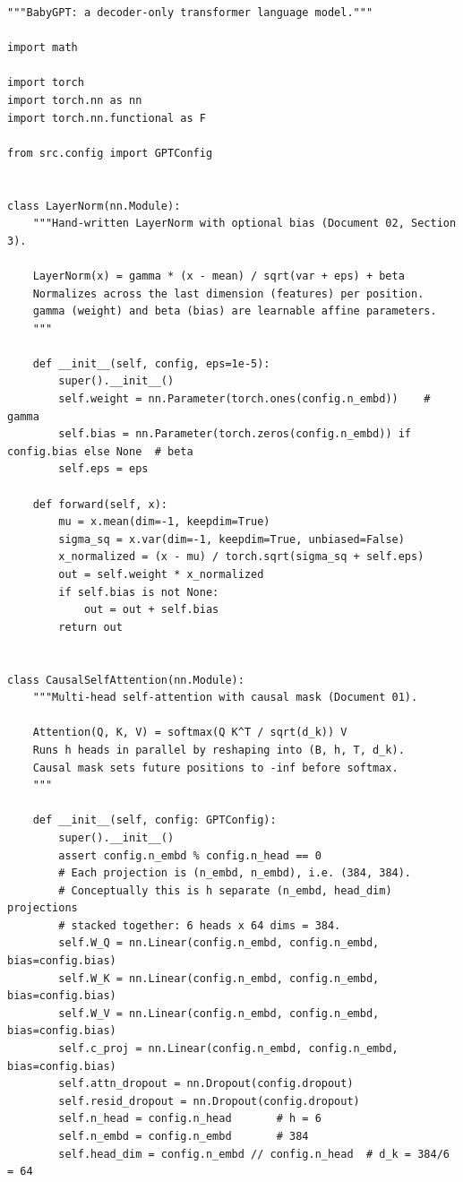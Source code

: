 \begin{lstlisting}
"""BabyGPT: a decoder-only transformer language model."""

import math

import torch
import torch.nn as nn
import torch.nn.functional as F

from src.config import GPTConfig


class LayerNorm(nn.Module):
    """Hand-written LayerNorm with optional bias (Document 02, Section 3).

    LayerNorm(x) = gamma * (x - mean) / sqrt(var + eps) + beta
    Normalizes across the last dimension (features) per position.
    gamma (weight) and beta (bias) are learnable affine parameters.
    """

    def __init__(self, config, eps=1e-5):
        super().__init__()
        self.weight = nn.Parameter(torch.ones(config.n_embd))    # gamma
        self.bias = nn.Parameter(torch.zeros(config.n_embd)) if config.bias else None  # beta
        self.eps = eps

    def forward(self, x):
        mu = x.mean(dim=-1, keepdim=True)
        sigma_sq = x.var(dim=-1, keepdim=True, unbiased=False)
        x_normalized = (x - mu) / torch.sqrt(sigma_sq + self.eps)
        out = self.weight * x_normalized
        if self.bias is not None:
            out = out + self.bias
        return out


class CausalSelfAttention(nn.Module):
    """Multi-head self-attention with causal mask (Document 01).

    Attention(Q, K, V) = softmax(Q K^T / sqrt(d_k)) V
    Runs h heads in parallel by reshaping into (B, h, T, d_k).
    Causal mask sets future positions to -inf before softmax.
    """

    def __init__(self, config: GPTConfig):
        super().__init__()
        assert config.n_embd % config.n_head == 0
        # Each projection is (n_embd, n_embd), i.e. (384, 384).
        # Conceptually this is h separate (n_embd, head_dim) projections
        # stacked together: 6 heads x 64 dims = 384.
        self.W_Q = nn.Linear(config.n_embd, config.n_embd, bias=config.bias)
        self.W_K = nn.Linear(config.n_embd, config.n_embd, bias=config.bias)
        self.W_V = nn.Linear(config.n_embd, config.n_embd, bias=config.bias)
        self.c_proj = nn.Linear(config.n_embd, config.n_embd, bias=config.bias)
        self.attn_dropout = nn.Dropout(config.dropout)
        self.resid_dropout = nn.Dropout(config.dropout)
        self.n_head = config.n_head       # h = 6
        self.n_embd = config.n_embd       # 384
        self.head_dim = config.n_embd // config.n_head  # d_k = 384/6 = 64


\end{lstlisting}

